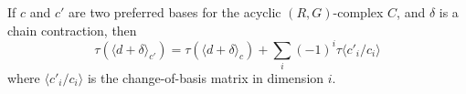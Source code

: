 If $c$ and $c'$ are two preferred bases for the acyclic $(R, G)$-complex $C$, and $\delta$ is a chain contraction, then
$$\tau(\langle d + \delta \rangle_{c'}) = \tau(\langle d + \delta \rangle_c) + \sum_i (-1)^i \tau\langle c'_i / c_i \rangle$$
where $\langle c'_i / c_i \rangle$ is the change-of-basis matrix in dimension $i$.

